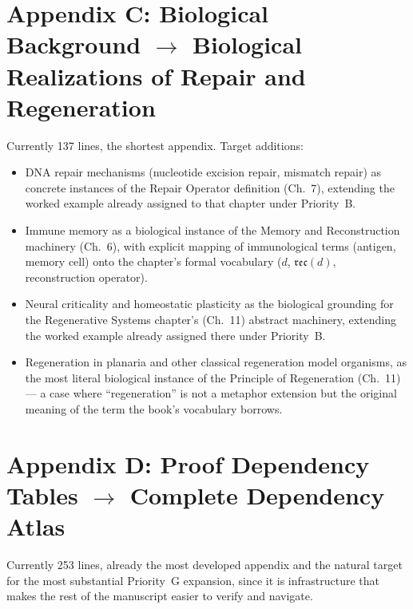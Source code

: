 \documentclass[11pt]{report}
\newcommand{\reco}{\mathfrak{rec}}
\begin{document}
\section{Appendix C: Biological Background \texorpdfstring{$\to$}{->} Biological Realizations of Repair and Regeneration}

Currently 137 lines, the shortest appendix. Target additions:

\begin{itemize}
\item DNA repair mechanisms (nucleotide excision repair,
  mismatch repair) as concrete instances of the Repair Operator
  definition (Ch.~7), extending the worked example already
  assigned to that chapter under Priority~B.
\item Immune memory as a biological instance of the Memory and
  Reconstruction machinery (Ch.~6), with explicit mapping of
  immunological terms (antigen, memory cell) onto the chapter's
  formal vocabulary ($d$, $\reco(d)$, reconstruction operator).
\item Neural criticality and homeostatic plasticity as the
  biological grounding for the Regenerative Systems chapter's
  (Ch.~11) abstract machinery, extending the worked example
  already assigned there under Priority~B.
\item Regeneration in planaria and other classical regeneration
  model organisms, as the most literal biological instance of
  the Principle of Regeneration (Ch.~11) --- a case where
  ``regeneration'' is not a metaphor extension but the original
  meaning of the term the book's vocabulary borrows.
\end{itemize}

\section{Appendix D: Proof Dependency Tables \texorpdfstring{$\to$}{->} Complete Dependency Atlas}

Currently 253 lines, already the most developed appendix and
the natural target for the most substantial Priority~G
expansion, since it is infrastructure that makes the rest of
the manuscript easier to verify and navigate.
\end{document}
